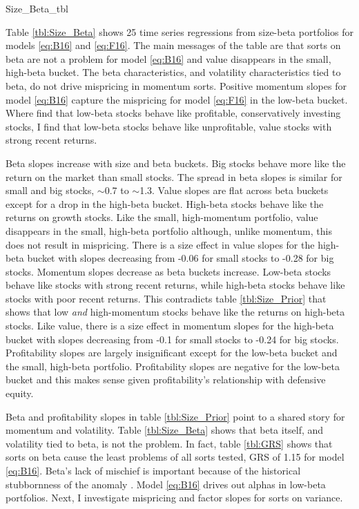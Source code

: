 
{Size_Beta_tbl}

Table \ref{tbl:Size_Beta} shows 25 time series regressions from size-beta
portfolios for models \ref{eq:B16} and \ref{eq:F16}.
The main messages of the table are that sorts on beta are not a problem for model
\ref{eq:B16} and value disappears in the small, high-beta bucket.
The beta characteristics, and volatility characteristics tied to beta, do not drive
mispricing in momentum sorts.
Positive momentum slopes for model \ref{eq:B16} capture the mispricing for 
model \ref{eq:F16} in the low-beta bucket.
Where \textcite{fama2016dissecting} find that low-beta stocks behave like
profitable, conservatively investing stocks, I find that low-beta stocks behave
like unprofitable, value stocks with strong recent returns.

Beta slopes increase with size and beta buckets.
Big stocks behave more like the return on the market than small stocks.
The spread in beta slopes is similar for small and big stocks,
$\sim$0.7 to $\sim$1.3.
Value slopes are flat across beta buckets except for a drop in the high-beta
bucket.
High-beta stocks behave like the returns on growth stocks.
Like the small, high-momentum portfolio, value disappears in the
small, high-beta portfolio although, unlike momentum,
this does not result in mispricing.
There is a size effect in value slopes for the high-beta bucket with slopes
decreasing from -0.06 for small stocks to -0.28 for big stocks.
Momentum slopes decrease as beta buckets increase.
Low-beta stocks behave like stocks with strong recent returns, while
high-beta stocks behave like stocks with poor recent returns.
This contradicts table \ref{tbl:Size_Prior} that shows that low \emph{and}
high-momentum stocks behave like the returns on high-beta stocks.
Like value, there is a size effect in momentum slopes for the high-beta bucket
with slopes decreasing from -0.1 for small stocks to -0.24 for big stocks.
Profitability slopes are largely insignificant except for the low-beta bucket
and the small, high-beta portfolio.
Profitability slopes are negative for the low-beta bucket and this makes sense
given profitability's relationship with defensive equity.

Beta and profitability slopes in table \ref{tbl:Size_Prior} point to a
shared story for momentum and volatility.
Table \ref{tbl:Size_Beta} shows that beta itself, and volatility tied to beta,
is not the problem.
In fact, table \ref{tbl:GRS} shows that sorts on beta cause the least problems
of all sorts tested, GRS of 1.15 for model \ref{eq:B16}.
Beta's lack of mischief is important because of the historical stubbornness of
the anomaly \parencite{jensen1972capital}.
Model \ref{eq:B16} drives out alphas in low-beta portfolios.
Next, I investigate mispricing and factor slopes for sorts on variance.
